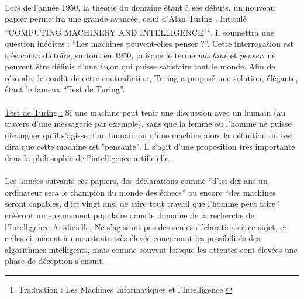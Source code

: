 \documentclass[10pt, french, a4paper]{report}
\begin{document}
\paragraph{}
Lors de l'année 1950, la théorie du domaine étant à ses débuts, un nouveau papier permettra une grande avancée, celui d'Alan Turing \citep{turing_i.computing_1950}. Intitulé ``COMPUTING MACHINERY AND INTELLIGENCE''\footnote{Traduction : Les Machines Informatiques et l'Intelligence.}, il soumettra une question inédites : ``Les machines peuvent-elles penser ?''. Cette interrogation est très contradictoire, surtout en 1950, puisque le terme \textit{machine} et \textit{penser}, ne peuvent être définis d’une façon qui puisse satisfaire tout le monde. Afin de résoudre le conflit de cette contradiction, Turing a proposé une solution, élégante, étant le fameux ``Test de Turing''. 

\paragraph{}
\underline{Test de Turing :} Si une machine peut tenir une discussion avec un humain (au travers d’une messagerie par exemple), sans que la femme ou l’homme ne puisse distinguer qu’il s’agisse d’un humain ou d’une machine alors la définition du test dira que cette machine est "pensante". Il s’agit d’une proposition très importante dans la philosophie de l’intelligence artificielle \citep{pinar_saygin_turing_2000}. 

\paragraph{}
Les années suivants ces papiers, des déclarations comme ``d’ici dix ans un ordinateur sera le champion du monde des échecs'' \citep{simon_heuristic_1958} ou encore ``des machines seront capables, d’ici vingt ans, de faire tout travail que l’homme peut faire'' \citep{simon_shape_1965} crééront un engouement populaire dans le domaine de la recherche de l'Intelligence Artificielle. Ne s'agissant pas des seules déclarations à ce sujet, et celles-ci mènent à une attente très élevée concernant les possibilités des algorithmes intelligents, mais comme souvent lorsque les attentes sont élevées une phase de déception s’ensuit.
\end{document}
